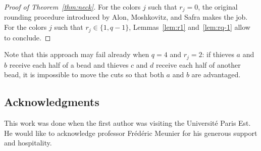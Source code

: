 \documentclass[12pt]{amsart}
\theoremstyle{remark}
\begin{document}
\begin{proof}[Proof of Theorem~\ref{thm:neck}]
For the colors $j$ such that $r_j=0$, the original rounding procedure introduced by Alon, Moshkovitz, and Safra makes the job. For the colors $j$ such that $r_j\in\{1,q-1\}$, Lemmas~\ref{lem:r1} and~\ref{lem:rq-1} allow to conclude.
\end{proof}


Note that this approach may fail already when $q=4$ and $r_j=2$: if thieves $a$ and $b$ receive each half of a bead and thieves $c$ and $d$ receive each half of another bead, it is impossible to move the cuts so that both $a$ and $b$ are advantaged.

\subsection*{Acknowledgments} This work was done when the first author was visiting the Universit\'e Paris Est. He would like to acknowledge professor Fr\'ed\'eric Meunier for his generous support and hospitality. 





\end{document}
